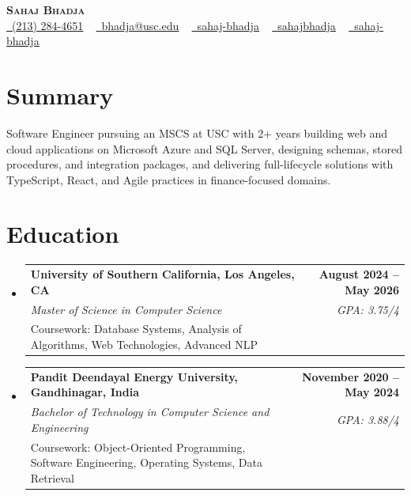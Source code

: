 \documentclass[letterpaper,10pt]{article}
\makeatletter
\newcommand{\resumeEduSubheading}[5]{\vspace{-1pt}\item\begin{tabular*}{1.0\textwidth}[t]{l@{\extracolsep{\fill}}r}\textbf{#1} & \textbf{\small #2} \\\textit{\small #3} & \textit{\small #4} \\\small #5 & \\\end{tabular*}\vspace{-4pt}}
\newcommand{\resumeSubHeadingListStart}{\begin{itemize}[leftmargin=0.0in, label={}]}
\newcommand{\resumeSubHeadingListEnd}{\end{itemize}}
\makeatother
\begin{document}
\begin{center}
{\Huge \scshape \textbf{Sahaj Bhadja}} \\ \vspace{1pt}
\small \href{tel:(213) 284-4651}{\faPhone\ \underline{(213) 284-4651}} ~ \href{mailto: bhadja@usc.edu}{\raisebox{-0.2\height}\faEnvelope\ \underline{bhadja@usc.edu}} ~
\href{https://www.linkedin.com/in/sahaj-bhadja/}{\raisebox{-0.2\height}\faLinkedin\ \underline{sahaj-bhadja}} ~ \href{https://github.com/SAHAJ-BHADJA}{\raisebox{-0.2\height}\faGithub\ \underline{sahajbhadja}} ~
\href{https://sahaj-bhadja.vercel.app/}{\raisebox{-0.2\height}\faGlobe\ \underline{sahaj-bhadja}}
\end{center}
\vspace{-16pt}
\section{Summary}
\begin{itemize}[leftmargin=0.15in, label={}]
\small{\item{Software Engineer pursuing an MSCS at USC with 2+ years building web and cloud applications on Microsoft Azure and SQL Server, designing schemas, stored procedures, and integration packages, and delivering full-lifecycle solutions with TypeScript, React, and Agile practices in finance-focused domains.}}
\end{itemize}
\vspace{-6pt}
\section{Education}
\resumeSubHeadingListStart
\resumeEduSubheading{University of Southern California, Los Angeles, CA}{August 2024 -- May 2026}{Master of Science in Computer Science}{GPA: 3.75/4}{Coursework: Database Systems, Analysis of Algorithms, Web Technologies, Advanced NLP}
\vspace{-9pt}
\resumeEduSubheading{Pandit Deendayal Energy University, Gandhinagar, India}{November 2020 -- May 2024}{Bachelor of Technology in Computer Science and Engineering}{GPA: 3.88/4}{Coursework: Object-Oriented Programming, Software Engineering, Operating Systems, Data Retrieval}
\resumeSubHeadingListEnd
\vspace{-6pt}
\end{document}
